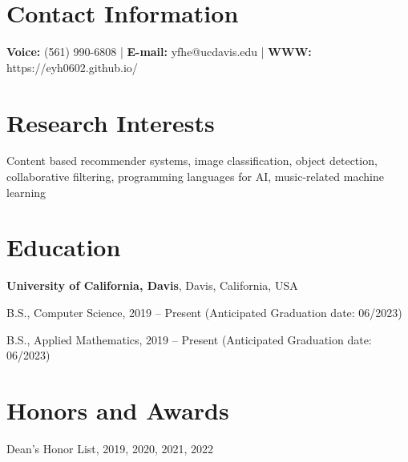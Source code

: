\documentclass[margin,line]{res}
\newenvironment{list1}{
  \begin{list}{\ding{113}}{%
      \setlength{\itemsep}{0in}
      \setlength{\parsep}{0in} \setlength{\parskip}{0in}
      \setlength{\topsep}{0in} \setlength{\partopsep}{0in} 
      \setlength{\leftmargin}{0.17in}}}{\end{list}}
\begin{document}

\begin{resume}
\section{\sc Contact Information}
\vspace{.05in}
\textbf{Voice:} (561) 990-6808 |
\textbf{E-mail:} yfhe@ucdavis.edu |
\textbf{WWW:} https://eyh0602.github.io/


\section{\sc Research Interests}
Content based recommender systems, image classification, object detection,
collaborative filtering, programming languages for AI,
music-related machine learning

\section{\sc Education}
{\bf University of California, Davis}, Davis, California, USA\\
\vspace*{-.1in}
\begin{list1}
\item[] B.S., Computer Science, 2019 -- Present (Anticipated Graduation date: 06/2023)
\item[] B.S., Applied Mathematics, 2019 -- Present (Anticipated Graduation date: 06/2023)
\end{list1}


\section{\sc Honors and Awards} 
Dean's Honor List, 2019, 2020, 2021, 2022


\end{resume}
\end{document}
